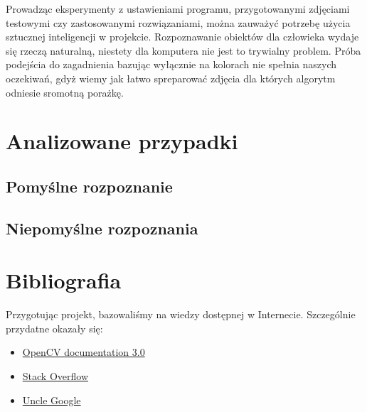 \documentclass{mwart}
\begin{document}
Prowadząc eksperymenty z ustawieniami programu, przygotowanymi zdjęciami testowymi czy zastosowanymi rozwiązaniami, można zauważyć potrzebę użycia sztucznej inteligencji w projekcie.
Rozpoznawanie obiektów dla człowieka wydaje się rzeczą naturalną, niestety dla komputera nie jest to trywialny problem. Próba podejścia do zagadnienia bazując wyłącznie na kolorach nie spełnia naszych oczekiwań, gdyż wiemy jak łatwo spreparować zdjęcia dla których algorytm odniesie sromotną porażkę.

\section{Analizowane przypadki}

\subsection{Pomyślne rozpoznanie}

\subsection{Niepomyślne rozpoznania}

\section{Bibliografia}

Przygotując projekt, bazowaliśmy na wiedzy dostępnej w Internecie. Szczególnie przydatne okazały się:

\begin{itemize}
    \item \href{https://docs.opencv.org/3.0-beta/index.html}{OpenCV documentation 3.0}
    \item \href{https://stackoverflow.com/}{Stack Overflow}
    \item \href{https://google.com/}{Uncle Google}
\end{itemize}
\end{document}
